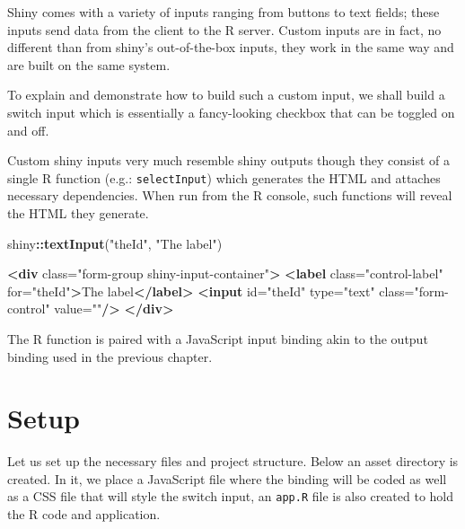 \documentclass[
]{krantz}
\makeatletter
\newenvironment{Shaded}{\begin{snugshade}}{\end{snugshade}}
\newcommand{\KeywordTok}[1]{\textcolor[rgb]{0.27,0.27,0.27}{\textbf{#1}}}
\newcommand{\NormalTok}[1]{#1}
\newcommand{\OperatorTok}[1]{\textcolor[rgb]{0.43,0.43,0.43}{\textbf{#1}}}
\newcommand{\OtherTok}[1]{\textcolor[rgb]{0.37,0.37,0.37}{#1}}
\newcommand{\StringTok}[1]{\textcolor[rgb]{0.5,0.5,0.5}{#1}}
\newenvironment{kframe}{%
\medskip{}
\setlength{\fboxsep}{.8em}
 \def\at@end@of@kframe{}%
 \ifinner\ifhmode%
  \def\at@end@of@kframe{\end{minipage}}%
  \begin{minipage}{\columnwidth}%
 \fi\fi%
 \def\FrameCommand##1{\hskip\@totalleftmargin \hskip-\fboxsep
 \colorbox{shadecolor}{##1}\hskip-\fboxsep
     \hskip-\linewidth \hskip-\@totalleftmargin \hskip\columnwidth}%
 \MakeFramed {\advance\hsize-\width
   \@totalleftmargin\z@ \linewidth\hsize
   \@setminipage}}%
 {\par\unskip\endMakeFramed%
 \at@end@of@kframe}
\renewenvironment{Shaded}{\begin{kframe}}{\end{kframe}}
\makeatother
\begin{document}
Shiny comes with a variety of inputs ranging from buttons to text fields; these inputs send data from the client to the R server. Custom inputs are in fact, no different than from shiny's out-of-the-box inputs, they work in the same way and are built on the same system.

To explain and demonstrate how to build such a custom input, we shall build a switch input which is essentially a fancy-looking checkbox that can be toggled on and off.

Custom shiny inputs very much resemble shiny outputs though they consist of a single R function (e.g.: \texttt{selectInput}) which generates the HTML and attaches necessary dependencies. When run from the R console, such functions will reveal the HTML they generate.

\begin{Shaded}
\begin{Highlighting}[]
\NormalTok{shiny}\OperatorTok{::}\KeywordTok{textInput}\NormalTok{(}\StringTok{"theId"}\NormalTok{, }\StringTok{"The label"}\NormalTok{)   }
\end{Highlighting}
\end{Shaded}

\begin{Shaded}
\begin{Highlighting}[]
\KeywordTok{<div}\OtherTok{ class=}\StringTok{"form{-}group shiny{-}input{-}container"}\KeywordTok{>}
  \KeywordTok{<label}\OtherTok{ class=}\StringTok{"control{-}label"}\OtherTok{ for=}\StringTok{"theId"}\KeywordTok{>}\NormalTok{The label}\KeywordTok{</label>}
  \KeywordTok{<input}\OtherTok{ id=}\StringTok{"theId"}\OtherTok{ type=}\StringTok{"text"}\OtherTok{ class=}\StringTok{"form{-}control"}\OtherTok{ value=}\StringTok{""}\KeywordTok{/>}
\KeywordTok{</div>}
\end{Highlighting}
\end{Shaded}

The R function is paired with a JavaScript input binding akin to the output binding used in the previous chapter.

\hypertarget{shiny-input-setup}{%
\section{Setup}\label{shiny-input-setup}}

Let us set up the necessary files and project structure. Below an asset directory is created. In it, we place a JavaScript file where the binding will be coded as well as a CSS file that will style the switch input, an \texttt{app.R} file is also created to hold the R code and application.
\end{document}
